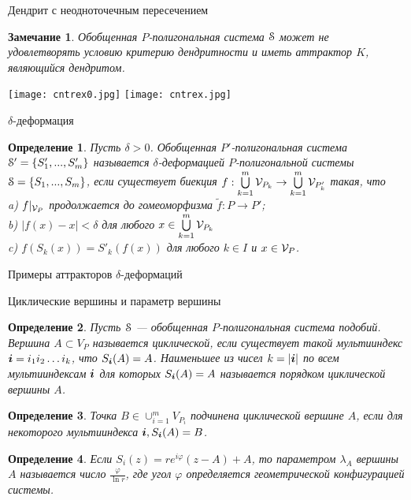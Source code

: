 \documentclass[aspectratio=1610, 10pt, notheorems]{beamer}
\newtheorem{definition}  {Определение}
\newtheorem{remark}      {Замечание}
\begin{document}
\begin{frame}{Дендрит с неодноточечным пересечением}
\begin{remark} 
Обобщенная $P$-полигональная система ${\EuScript S}$ может не удовлетворять условию критерию дендритности и иметь аттрактор $K$, являющийся дендритом.
\end{remark}
\vfill
\texttt{[image: cntrex0.jpg]}
\hfill
\texttt{[image: cntrex.jpg]} 
\end{frame}


\begin{frame}{$\delta$-деформация}
\begin{definition}
Пусть $\delta>0$. 
Обобщенная $P'$-полигональная система ${\EuScript S}'=\{S'_1,...,S'_m\}$ называется $\delta$-деформацией $P$-полигональной системы ${\EuScript S}=\{S_1,...,S_m\}$, если существует биекция $f:\bigcup\limits_{k=1}^m {\mathcal V}_{P_k}\to \bigcup\limits_{k=1}^m {\mathcal V}_{P'_k}$ такая, что\\
a) $f|_{{\mathcal V}_P}$ продолжается до гомеоморфизма $\tilde f: P\to  P'$; \\ 
b) $|f(x)-x|<\delta$  для любого $x\in \bigcup\limits_{k=1}^m {\mathcal V}_{P_k}$\\  
c) $f(S_k(x))=S'_k(f(x))$ для любого $k\in I$ и $x\in {\mathcal V}_P$.
\end{definition}
\end{frame}


\begin{frame}{Примеры аттракторов $\delta$-деформаций}
\end{frame}


\begin{frame}{Циклические вершины и параметр вершины}
\begin{definition}
Пусть ${\EuScript S}$ --- обобщенная $P$-полигональная  система подобий. Вершина $A \subset V_P$ называется циклической, если существует такой мультииндекс  ${\bm{i}}=i_1 i_2 \ldots i_k$, что $S_{\bm{i}}(A)=A$. Наименьшее из чисел $k=|{\bm{i}}|$ по всем мультииндексам ${\bm{i}}$ для которых $S_{\bm{i}}(A)=A$ называется порядком циклической вершины $A$.
\end{definition}

\begin{definition}
Точка $B \in\cup_{i=1}^m  V_{P_i}$ подчинена циклической вершине $A$, если для некоторого мультииндекса ${\bm{i}}, S_{{\bm{i}}}(A)=B$.
\end{definition}

\begin{definition}
Если $S_i(z)=r e^{i \varphi} (z-A)+A$, то параметром $\lambda _A$ вершины $A$ называется число $\frac{\varphi}{\ln{r}}$, где угол $\varphi$ определяется геометрической конфигурацией системы.
\end{definition}
\end{frame}
\end{document}
